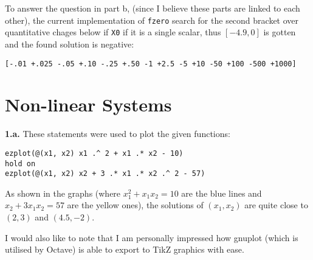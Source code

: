 \documentclass[a4paper,12pt]{article}
\newcommand{\exercise}[1]{\noindent\textbf{#1.}}
\begin{document}
To answer the question in part b, (since I believe these parts are linked
to each other), the current implementation of \verb|fzero| search for
the second bracket over quantitative chages below if \verb|X0| if it is a
single scalar, thus $[-4.9, 0]$ is gotten and the found solution is negative:

\begin{verbatim}
[-.01 +.025 -.05 +.10 -.25 +.50 -1 +2.5 -5 +10 -50 +100 -500 +1000]
\end{verbatim}

\section{Non-linear Systems}
\exercise{1.a} These statements were used to plot the given functions:
\begin{verbatim}
ezplot(@(x1, x2) x1 .^ 2 + x1 .* x2 - 10)
hold on
ezplot(@(x1, x2) x2 + 3 .* x1 .* x2 .^ 2 - 57)
\end{verbatim}

As shown in the graphs (where $x_1^2 + x_1 x_2 = 10$ are the blue lines
and $x_2 + 3 x_1 x_2 = 57$ are the yellow ones), the solutions of $(x_1, x_2)$
are quite close to $(2, 3)$ and $(4.5, -2)$.

\begin{figure}[!h]
  \centering
  \scalebox{0.37}{}
\end{figure}

I would also like to note that I am personally impressed how gnuplot
(which is utilised by Octave) is able to export to TikZ graphics with ease.
\end{document}
